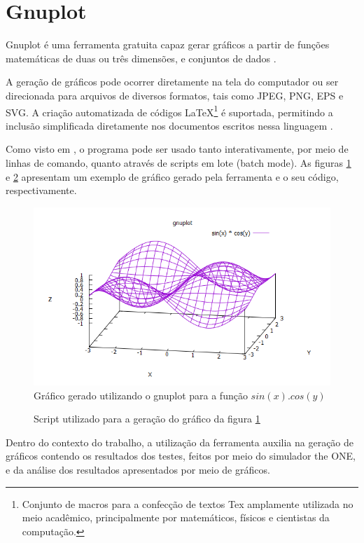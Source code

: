 \section{Gnuplot}\label{sec:gnuplot}

Gnuplot é uma ferramenta gratuita capaz gerar gráficos a partir de funções matemáticas de duas ou três dimensões, e conjuntos de dados \cite{gnuplot5Doc}.

A geração de gráficos pode ocorrer diretamente na tela do computador ou ser direcionada para arquivos de diversos formatos, tais como JPEG, PNG, EPS e SVG. A criação automatizada de códigos LaTeX\footnote{Conjunto de macros para a confecção de textos Tex amplamente utilizada no meio acadêmico, principalmente por matemáticos, físicos e cientistas da computação.} é suportada, permitindo a inclusão simplificada diretamente nos documentos escritos nessa linguagem \cite{gnuplot5Doc}. 

Como visto em \cite{gnuplot5Doc}, o programa pode ser usado tanto interativamente, por meio de linhas de comando, quanto através de scripts em lote (batch mode). As figuras \ref{gnu_sincos} e \ref{gnu_sincos_code} apresentam um exemplo de gráfico gerado pela ferramenta e o seu código, respectivamente.

\begin{figure}[htp!]
\centering
\includegraphics[width=1\textwidth]{figuras/cap_3/secao_3/gnuplot_sincos.png}
\caption{Gráfico gerado utilizando o gnuplot para a função $sin(x) . cos(y)$}
\label{gnu_sincos}
\end{figure}

\begin{figure}[htp!]
\centering

\caption{Script utilizado para a geração do gráfico da figura \ref{gnu_sincos}}
\label{gnu_sincos_code}
\end{figure}

Dentro do contexto do trabalho, a utilização da ferramenta auxilia na geração de gráficos contendo os resultados dos testes, feitos por meio do simulador the ONE, e da análise dos resultados apresentados por meio de gráficos.